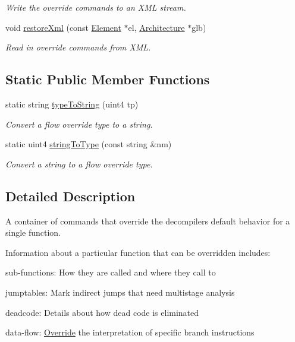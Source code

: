 \begin{DoxyCompactItemize}
\begin{DoxyCompactList}\small\item\em Write the override commands to an X\+ML stream. \end{DoxyCompactList}\item 
void \mbox{\hyperlink{class_override_a81f34dfc11c427ea0873358bef93ada3}{restore\+Xml}} (const \mbox{\hyperlink{class_element}{Element}} $\ast$el, \mbox{\hyperlink{class_architecture}{Architecture}} $\ast$glb)
\begin{DoxyCompactList}\small\item\em Read in override commands from X\+ML. \end{DoxyCompactList}\end{DoxyCompactItemize}
\subsection*{Static Public Member Functions}
\begin{DoxyCompactItemize}
\item 
static string \mbox{\hyperlink{class_override_a33a4d3c7956892c27e2ab851c04bd6b7}{type\+To\+String}} (uint4 tp)
\begin{DoxyCompactList}\small\item\em Convert a flow override type to a string. \end{DoxyCompactList}\item 
static uint4 \mbox{\hyperlink{class_override_a7456d7f93fb0f67cdebb42ac1bca5c46}{string\+To\+Type}} (const string \&nm)
\begin{DoxyCompactList}\small\item\em Convert a string to a flow override type. \end{DoxyCompactList}\end{DoxyCompactItemize}


\subsection{Detailed Description}
A container of commands that override the decompiler\textquotesingle{}s default behavior for a single function. 

Information about a particular function that can be overridden includes\+:
\begin{DoxyItemize}
\item sub-\/functions\+: How they are called and where they call to
\item jumptables\+: Mark indirect jumps that need multistage analysis
\item deadcode\+: Details about how dead code is eliminated
\item data-\/flow\+: \mbox{\hyperlink{class_override}{Override}} the interpretation of specific branch instructions
\end{DoxyItemize}


